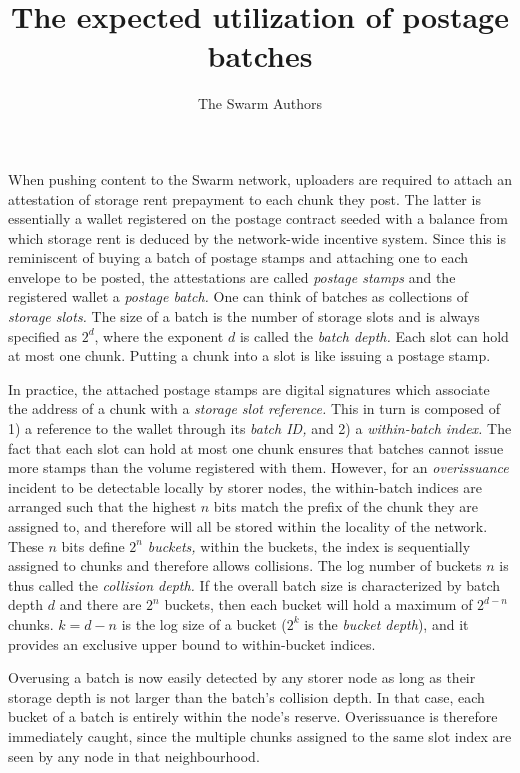 \documentclass[
  letterpaper,
  DIV=11,
  numbers=noendperiod]{scrartcl}
\title{The expected utilization of postage batches}
\author{The Swarm Authors}
\date{}
\begin{document}
\maketitle
\ifdefined\Shaded\renewenvironment{Shaded}{\begin{tcolorbox}[boxrule=0pt, sharp corners, frame hidden, interior hidden, borderline west={3pt}{0pt}{shadecolor}, breakable, enhanced]}{\end{tcolorbox}}\fi

When pushing content to the Swarm network, uploaders are required to
attach an attestation of storage rent prepayment to each chunk they
post. The latter is essentially a wallet registered on the postage
contract seeded with a balance from which storage rent is deduced by the
network-wide incentive system. Since this is reminiscent of buying a
batch of postage stamps and attaching one to each envelope to be posted,
the attestations are called \emph{postage stamps} and the registered
wallet a \emph{postage batch.} One can think of batches as collections
of \emph{storage slots.} The size of a batch is the number of storage
slots and is always specified as $2^d$, where the exponent $d$ is
called the \emph{batch depth.} Each slot can hold at most one chunk.
Putting a chunk into a slot is like issuing a postage stamp.

In practice, the attached postage stamps are digital signatures which
associate the address of a chunk with a \emph{storage slot reference.}
This in turn is composed of 1) a reference to the wallet through its
\emph{batch ID,} and 2) a \emph{within-batch index.} The fact that each
slot can hold at most one chunk ensures that batches cannot issue more
stamps than the volume registered with them. However, for an
\emph{overissuance} incident to be detectable locally by storer nodes,
the within-batch indices are arranged such that the highest $n$ bits
match the prefix of the chunk they are assigned to, and therefore will
all be stored within the locality of the network. These $n$ bits
define $2^n$ \emph{buckets,} within the buckets, the index is
sequentially assigned to chunks and therefore allows collisions. The log
number of buckets $n$ is thus called the \emph{collision depth.} If
the overall batch size is characterized by batch depth $d$ and there
are $2^n$ buckets, then each bucket will hold a maximum of $2^{d-n}$
chunks. $k=d-n$ is the log size of a bucket ($2^k$ is the
\emph{bucket depth}), and it provides an exclusive upper bound to
within-bucket indices.

Overusing a batch is now easily detected by any storer node as long as
their storage depth is not larger than the batch's collision depth. In
that case, each bucket of a batch is entirely within the node's reserve.
Overissuance is therefore immediately caught, since the multiple chunks
assigned to the same slot index are seen by any node in that
neighbourhood.
\end{document}
